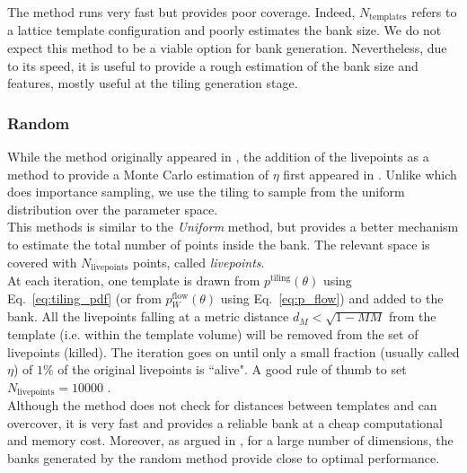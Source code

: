 \documentclass[twocolumn,showpacs,preprintnumbers,nofootinbib,prd,
superscriptaddress,10pt]{revtex4-2}
\begin{document}
The method runs very fast but provides poor coverage. Indeed, $N_{\text{templates}}$ refers to a lattice template configuration and poorly estimates the bank size. We do not expect this method to be a viable option for bank generation.
Nevertheless, due to its speed, it is useful to provide a rough estimation of the bank size and features, mostly useful at the tiling generation stage.

\subsubsection{Random}\label{par:random}
While the method originally appeared in \cite{Messenger:2008ta}, the addition of the livepoints as a method to provide a Monte Carlo estimation of $\eta$ first appeared in \cite{Coogan:2022qxs}. Unlike \cite{Coogan:2022qxs} which does importance sampling, we use the tiling to sample from the uniform distribution over the parameter space.
\\
This methods is similar to the {\it Uniform} method, but provides a better mechanism to estimate the total number of points inside the bank.
The relevant space is covered with $N_\mathrm{livepoints}$ points, called {\it livepoints}.
\\
At each iteration, one template is drawn from $p^{\text{tiling}}(\theta)$ using Eq.~\eqref{eq:tiling_pdf} (or from $p^{\text{flow}}_W(\theta)$ using Eq.~\eqref{eq:p_flow}) and added to the bank. All the livepoints falling at a metric distance $d_M<\sqrt{1-MM}$ from the template (i.e. within the template volume) will be removed from the set of livepoints (killed). The iteration goes on until only a small fraction (usually called $\eta$) of $1\%$ of the original livepoints is ``alive". A good rule of thumb to set $N_\mathrm{livepoints} = 10000$ \cite{Coogan:2022qxs}.
\\
Although the method does not check for distances between templates and can overcover, it is very fast and provides a reliable bank at a cheap computational and memory cost.
Moreover, as argued in \cite{Messenger:2008ta, Allen:2021yuy, Allen:2022lqr}, for a large number of dimensions, the banks generated by the random method provide close to optimal performance.
\end{document}
